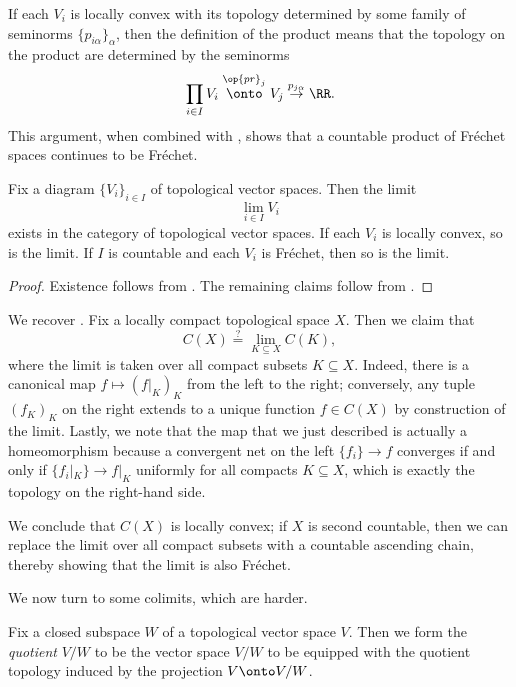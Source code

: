 \documentclass[notes.tex]{subfiles}
\begin{document}
\begin{remark} \label{rem:product-frechet}
	If each $V_i$ is locally convex with its topology determined by some family of seminorms $\{p_{i\alpha}\}_\alpha$, then the definition of the product means that the topology on the product are determined by the seminorms
	\[\prod_{i\in I}V_i\stackrel{\op{pr}_j}\onto V_j\stackrel{p_{j\alpha}}\to\RR.\]
	This argument, when combined with , shows that a countable product of Fr\'echet spaces continues to be Fr\'echet.
\end{remark}
\begin{proposition}
	Fix a diagram $\{V_i\}_{i\in I}$ of topological vector spaces. Then the limit
	\[\lim_{i\in I}V_i\]
	exists in the category of topological vector spaces. If each $V_i$ is locally convex, so is the limit. If $I$ is countable and each $V_i$ is Fr\'echet, then so is the limit.
\end{proposition}
\begin{proof}
	Existence follows from . The remaining claims follow from .
\end{proof}
\begin{example} \label{ex:c-x-frechet-cat-theory}
	We recover . Fix a locally compact topological space $X$. Then we claim that
	\[C(X)\stackrel?=\lim_{K\subseteq X}C(K),\]
	where the limit is taken over all compact subsets $K\subseteq X$. Indeed, there is a canonical map $f\mapsto(f|_K)_K$ from the left to the right; conversely, any tuple $(f_K)_K$ on the right extends to a unique function $f\in C(X)$ by construction of the limit. Lastly, we note that the map that we just described is actually a homeomorphism because a convergent net on the left $\{f_i\}\to f$ converges if and only if $\{f_i|_K\}\to f|_K$ uniformly for all compacts $K\subseteq X$, which is exactly the topology on the right-hand side.
	
	We conclude that $C(X)$ is locally convex; if $X$ is second countable, then we can replace the limit over all compact subsets with a countable ascending chain, thereby showing that the limit is also Fr\'echet.
\end{example}
We now turn to some colimits, which are harder.
\begin{definition}[quotient]
	Fix a closed subspace $W$ of a topological vector space $V$. Then we form the \textit{quotient} $V/W$ to be the vector space $V/W$ to be equipped with the quotient topology induced by the projection $V\onto V/W$.
\end{definition}
\end{document}
